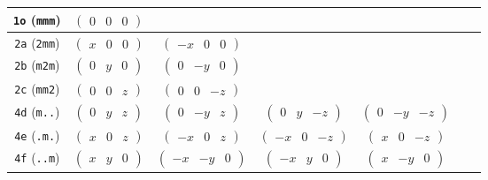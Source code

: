 \documentclass[fleqn,9pt,landscape]{jsarticle}
\begin{document}
\begin{center}
\begin{longtable}{ccccccc}
{\tt 1o} ({\tt mmm}) & $ \begin{pmatrix} 0 & 0 & 0 \end{pmatrix} $ & $  $ & $  $ & $  $ & $  $ & $  $ \\ \hline
{\tt 2a} ({\tt 2mm}) & $ \begin{pmatrix} x & 0 & 0 \end{pmatrix} $ & $ \begin{pmatrix} - x & 0 & 0 \end{pmatrix} $ & $  $ & $  $ & $  $ & $  $ \\ \hline
{\tt 2b} ({\tt m2m}) & $ \begin{pmatrix} 0 & y & 0 \end{pmatrix} $ & $ \begin{pmatrix} 0 & - y & 0 \end{pmatrix} $ & $  $ & $  $ & $  $ & $  $ \\ \hline
{\tt 2c} ({\tt mm2}) & $ \begin{pmatrix} 0 & 0 & z \end{pmatrix} $ & $ \begin{pmatrix} 0 & 0 & - z \end{pmatrix} $ & $  $ & $  $ & $  $ & $  $ \\ \hline
{\tt 4d} ({\tt m..}) & $ \begin{pmatrix} 0 & y & z \end{pmatrix} $ & $ \begin{pmatrix} 0 & - y & z \end{pmatrix} $ & $ \begin{pmatrix} 0 & y & - z \end{pmatrix} $ & $ \begin{pmatrix} 0 & - y & - z \end{pmatrix} $ & $  $ & $  $ \\ \hline
{\tt 4e} ({\tt .m.}) & $ \begin{pmatrix} x & 0 & z \end{pmatrix} $ & $ \begin{pmatrix} - x & 0 & z \end{pmatrix} $ & $ \begin{pmatrix} - x & 0 & - z \end{pmatrix} $ & $ \begin{pmatrix} x & 0 & - z \end{pmatrix} $ & $  $ & $  $ \\ \hline
{\tt 4f} ({\tt ..m}) & $ \begin{pmatrix} x & y & 0 \end{pmatrix} $ & $ \begin{pmatrix} - x & - y & 0 \end{pmatrix} $ & $ \begin{pmatrix} - x & y & 0 \end{pmatrix} $ & $ \begin{pmatrix} x & - y & 0 \end{pmatrix} $ & $  $ & $  $ \\ \hline

\end{longtable}
\end{center}
\end{document}
